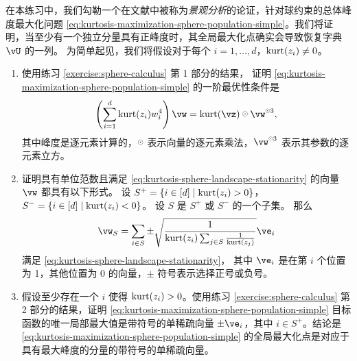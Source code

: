 \documentclass[../../book-main.tex]{subfiles}
\begin{document}
\begin{exercise}\label{exercise:kurtosis-sphere-landscape}
    在本练习中，我们勾勒一个在文献中被称为\textit{景观分析}的论证，针对球约束的总体峰度最大化问题 \eqref{eq:kurtosis-maximization-sphere-population-simple}。我们将证明，当至少有一个独立分量具有正峰度时，其全局最大化点确实会导致恢复字典 $\vU$ 的一列。
    为简单起见，我们将假设对于每个 $i = 1, \dots, d$，$\mathop{\mathrm{kurt}}(z_i) \neq 0$。
    \begin{enumerate}
        \item 使用练习 \ref{exercise:sphere-calculus} 第 1 部分的结果，
        证明 \eqref{eq:kurtosis-maximization-sphere-population-simple} 的一阶最优性条件是
        \begin{equation}\label{eq:kurtosis-sphere-landscape-stationarity}
            \left(\sum_{i=1}^d \kurt(z_i) w_i^4 \right) 
            \vw = \kurt(\vz) \hada \vw^{\hada 3}, 
        \end{equation}
        其中峰度是逐元素计算的，$\hada$ 表示向量的逐元素乘法，$\vw^{\hada 3}$ 表示其参数的逐元素立方。
        \item 证明具有单位范数且满足 \eqref{eq:kurtosis-sphere-landscape-stationarity} 的向量 $\vw$
        都具有以下形式。
        设 $S^+ = \set{i \in [d] \given \kurt(z_i) > 0}$，
        $S^- = \set{i \in [d] \given \kurt(z_i) < 0}$。
        设 $S$ 是 $S^+$ 或 $S^-$ 的一个子集。
        那么
        \begin{equation}\label{eq:kurtosis-sphere-landscape-cps}
            \vw_S = \sum_{i \in S} \pm \sqrt{\frac{1}{\kurt(z_i) \sum_{j \in S} \frac{1}{\kurt(z_j)}}} \ve_i
        \end{equation}
        满足 \eqref{eq:kurtosis-sphere-landscape-stationarity}，
        其中 $\ve_i$ 是在第 $i$ 个位置为 1，其他位置为 0 的向量，$\pm$ 符号表示选择正号或负号。
        \item 假设至少存在一个 $i$ 使得 $\mathop{\mathrm{kurt}}(z_i) > 0$。使用练习 \ref{exercise:sphere-calculus} 第 2 部分的结果，证明 \eqref{eq:kurtosis-maximization-sphere-population-simple} 目标函数的唯一局部最大值是带符号的单稀疏向量 $\pm \ve_i$，其中 $i \in S^+$。结论是 \eqref{eq:kurtosis-maximization-sphere-population-simple} 的全局最大化点是对应于具有最大峰度的分量的带符号的单稀疏向量。%

\end{enumerate}
\end{exercise}
\end{document}
